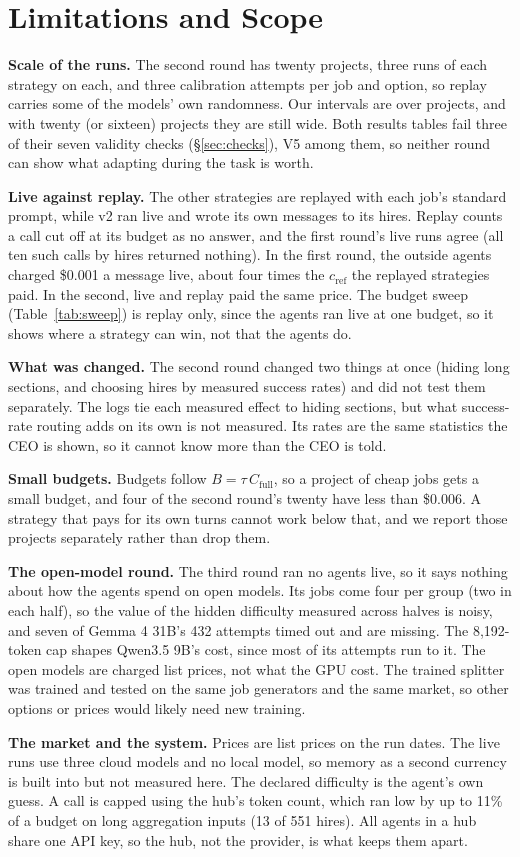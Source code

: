 \section{Limitations and Scope}
\label{sec:limitations}

\textbf{Scale of the runs.} The second round has twenty projects, three runs of each strategy on each, and three
calibration attempts per job and option, so replay carries some of the models' own randomness. Our intervals are over
projects, and with twenty (or sixteen) projects they are still wide. Both results tables fail three of their seven
validity checks (\S\ref{sec:checks}), V5 among them, so neither round can show what adapting during the task is worth.

\textbf{Live against replay.} The other strategies are replayed with each job's standard prompt, while \sys{} v2 ran
live and wrote its own messages to its hires. Replay counts a call cut off at its budget as no answer, and the first
round's live runs agree (all ten such calls by hires returned nothing). In the first round, the outside agents charged
\sys{} \$0.001 a message live, about four times the $c_\mathrm{ref}$ the replayed strategies paid. In the second, live
and replay paid the same price. The budget sweep (Table~\ref{tab:sweep}) is replay only, since the agents ran live at
one budget, so it shows where a strategy can win, not that the agents do.

\textbf{What was changed.} The second round changed two things at once (hiding long sections, and choosing hires by
measured success rates) and did not test them separately. The logs tie each measured effect to hiding sections, but
what success-rate routing adds on its own is not measured. Its rates are the same statistics the CEO is shown, so it
cannot know more than the CEO is told.

\textbf{Small budgets.} Budgets follow $B = \tau\,C_\mathrm{full}$, so a project of cheap jobs gets a small budget, and
four of the second round's twenty have less than \$0.006. A strategy that pays for its own turns cannot work below that,
and we report those projects separately rather than drop them.

\textbf{The open-model round.} The third round ran no agents live, so it says nothing about how the agents spend on open
models. Its jobs come four per group (two in each half), so the value of the hidden difficulty measured across halves
is noisy, and seven of Gemma 4 31B's 432 attempts timed out and are missing. The 8,192-token cap shapes Qwen3.5 9B's
cost, since most of its attempts run to it. The open models are charged list prices, not what the GPU cost. The trained
splitter was trained and tested on the same job generators and the same market, so other options or prices would likely
need new training.

\textbf{The market and the system.} Prices are list prices on the run dates. The live runs use three cloud models and no
local model, so memory as a second currency is built into \sys{} but not measured here. The declared difficulty is the
agent's own guess. A call is capped using the hub's token count, which ran low by up to 11\% of a budget on long
aggregation inputs (13 of 551 hires). All agents in a hub share one API key, so the hub, not the provider, is what keeps
them apart.

